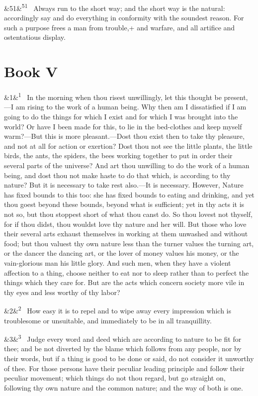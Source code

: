 \documentclass[12pt]{article}
\newcommand{\para}[1][]{\par\noindent\ifx&#1&\else\textsuperscript{\footnotesize #1}~\fi}
\begin{document}
\para[51] Always run to the short way; and the short way is the natural:
accordingly say and do everything in conformity with the soundest
reason. For such a purpose frees a man from trouble,+ and warfare, and
all artifice and ostentatious display.

\section*{Book V}

\para[1] In the morning when thou risest unwillingly, let this thought be
present,---I am rising to the work of a human being. Why then am I
dissatisfied if I am going to do the things for which I exist and for
which I was brought into the world? Or have I been made for this, to lie
in the bed-clothes and keep myself warm?---But this is more
pleasant.---Dost thou exist then to take thy pleasure, and not at all for
action or exertion? Dost thou not see the little plants, the little
birds, the ants, the spiders, the bees working together to put in order
their several parts of the universe? And art thou unwilling to do the
work of a human being, and dost thou not make haste to do that which, is
according to thy nature? But it is necessary to take rest also.---It is
necessary. However, Nature has fixed bounds to this too: she has fixed
bounds to eating and drinking, and yet thou goest beyond these bounds,
beyond what is sufficient; yet in thy acts it is not so, but thou
stoppest short of what thou canst do. So thou lovest not thyself, for if
thou didst, thou wouldst love thy nature and her will. But those who
love their several arts exhaust themselves in working at them unwashed
and without food; but thou valuest thy own nature less than the turner
values the turning art, or the dancer the dancing art, or the lover of
money values his money, or the vain-glorious man his little glory. And
such men, when they have a violent affection to a thing, choose neither
to eat nor to sleep rather than to perfect the things which they care
for. But are the acts which concern society more vile in thy eyes and
less worthy of thy labor?

\para[2] How easy it is to repel and to wipe away every impression which is
troublesome or unsuitable, and immediately to be in all tranquillity.

\para[3] Judge every word and deed which are according to nature to be fit for
thee; and be not diverted by the blame which follows from any people,
nor by their words, but if a thing is good to be done or said, do not
consider it unworthy of thee. For those persons have their peculiar
leading principle and follow their peculiar movement; which things do
not thou regard, but go straight on, following thy own nature and the
common nature; and the way of both is one.
\end{document}
